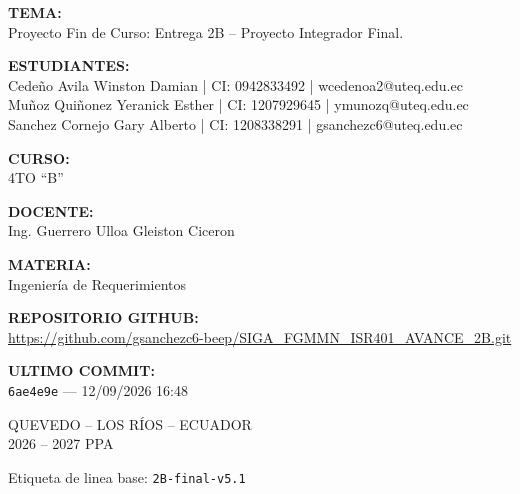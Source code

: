 \documentclass[12pt,a4paper]{article}
\begin{document}
\textbf{TEMA:}\\
Proyecto Fin de Curso: Entrega 2B -- Proyecto Integrador Final.

\bigskip
\textbf{ESTUDIANTES:}\\
Cede\~no Avila Winston Damian | CI: 0942833492 | wcedenoa2@uteq.edu.ec\\
Mu\~noz Qui\~nonez Yeranick Esther | CI: 1207929645 | ymunozq@uteq.edu.ec\\
Sanchez Cornejo Gary Alberto | CI: 1208338291 | gsanchezc6@uteq.edu.ec

\bigskip
\textbf{CURSO:}\\
4TO ``B''

\bigskip
\textbf{DOCENTE:}\\
Ing. Guerrero Ulloa Gleiston Ciceron

\bigskip
\textbf{MATERIA:}\\
Ingenier\'ia de Requerimientos

\bigskip
\textbf{REPOSITORIO GITHUB:}\\
\url{https://github.com/gsanchezc6-beep/SIGA_FGMMN_ISR401_AVANCE_2B.git}

\bigskip
\textbf{ULTIMO COMMIT:}\\
\texttt{6ae4e9e} --- 12/09/2026 16:48

\vspace{2cm}
\begin{center}
QUEVEDO -- LOS R\'IOS -- ECUADOR\\
2026 -- 2027 PPA
\end{center}

\vspace{1cm}
Etiqueta de linea base: \texttt{2B-final-v5.1}
\end{document}
